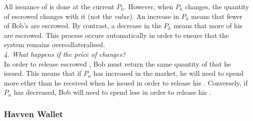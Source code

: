 \noindent All issuance of \NOM{} is done at the current $P_h$. However, when $P_h$ changes, the quantity of escrowed \HAV{} changes with it (not the \emph{value}). An increase in $P_h$ means that fewer of Bob's \HAV{} are escrowed. By contrast, a decrease in the $P_h$ means that more of his \HAV{} are escrowed. This process occurs automatically in order to ensure that the system remains overcollateralised. \\ 

\noindent \emph{4. What happens if the price of \NOM{} changes?} \\ 

\noindent In order to release escrowed \HAV{}, Bob must return the same quantity of \NOM{} that he issued. This means that if $P_n$ has increased in the market, he will need to spend more ether than he received when he issued in order to release his \HAV{}. Conversely, if $P_n$ has decreased, Bob will need to spend less in order to release his \HAV{}.

\subsubsection{Havven Wallet}


\newpage
